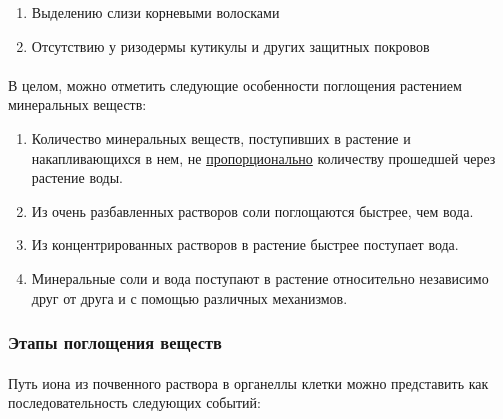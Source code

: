 \begin{enumerate}
	\item Выделению слизи корневыми волосками
	\item Отсутствию у ризодермы кутикулы и других защитных покровов
\end{enumerate}
 

\paragraph*{}В целом, можно отметить следующие особенности поглощения растением минеральных веществ: 

\begin{enumerate}
	\item Количество минеральных веществ, поступивших в растение и накапливающихся в нем, не \hyperlink{what_is_transport_type}{пропорционально} количеству прошедшей через растение воды.
	\item Из очень разбавленных растворов соли поглощаются быстрее, чем вода.
	\item Из концентрированных растворов в растение быстрее поступает вода.
	\item Минеральные соли и вода поступают в растение относительно независимо друг от друга и с помощью различных механизмов.
\end{enumerate}

\subsubsection*{Этапы поглощения веществ}

\paragraph*{}Путь иона из почвенного раствора в органеллы клетки можно представить как последовательность следующих событий:

